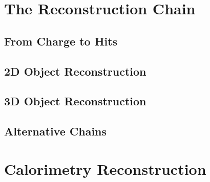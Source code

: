 \section{The Reconstruction Chain}\label{sec:ReconstructionChain}

\subsection{From Charge to Hits}\label{sec:HitReconstruction}

\subsection{2D Object Reconstruction}\label{sec:2DReconstruction}

\subsection{3D Object Reconstruction}\label{sec:3DReconstruction}

\subsection{Alternative Chains}\label{sec:AlternativeChains}

\section{Calorimetry Reconstruction}\label{sec:Calorimetry}

